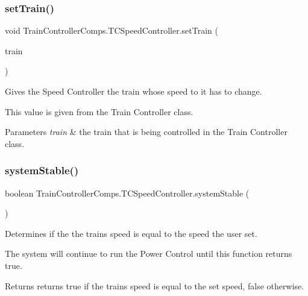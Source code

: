 \subsubsection{\texorpdfstring{set\+Train()}{setTrain()}}
{\footnotesize\ttfamily void Train\+Controller\+Comps.\+T\+C\+Speed\+Controller.\+set\+Train (\begin{DoxyParamCaption}\item[{\hyperlink{classTrainControllerComps_1_1TestTrain}{Test\+Train}}]{train }\end{DoxyParamCaption})}



Gives the Speed Controller the train whose speed to it has to change. 

This value is given from the Train Controller class.


\begin{DoxyParams}{Parameters}
{\em train} & the train that is being controlled in the Train Controller class. \\
\hline
\end{DoxyParams}
\mbox{\label{classTrainControllerComps_1_1TCSpeedController_a1a67c88e2bbc9543cfe1a910c7cab35f}} 
\subsubsection{\texorpdfstring{system\+Stable()}{systemStable()}}
{\footnotesize\ttfamily boolean Train\+Controller\+Comps.\+T\+C\+Speed\+Controller.\+system\+Stable (\begin{DoxyParamCaption}{ }\end{DoxyParamCaption})\hspace{0.3cm}{\ttfamily [private]}}



Determines if the the train\textquotesingle{}s speed is equal to the speed the user set. 

The system will continue to run the Power Control until this function returns true.

\begin{DoxyReturn}{Returns}
returns true if the train\textquotesingle{}s speed is equal to the set speed, false otherwise. 
\end{DoxyReturn}


